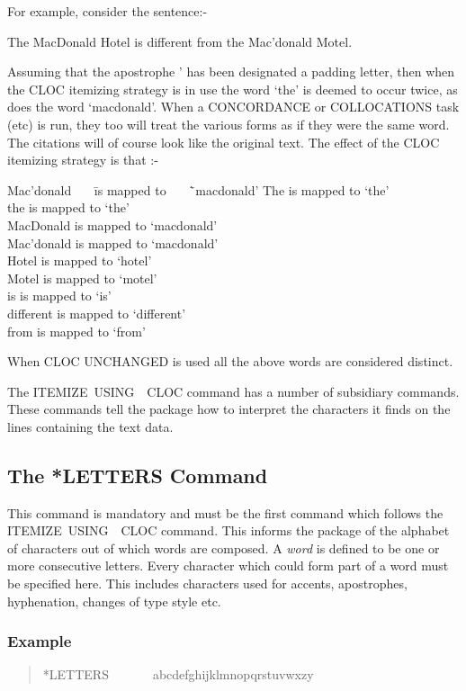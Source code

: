 For example, consider the sentence:-

The MacDonald Hotel is different from the Mac'donald Motel.

Assuming that the apostrophe ' has been designated a padding letter, then
when the CLOC itemizing strategy is in use the word `the' is deemed
to occur twice, as does the word `macdonald'. When a CONCORDANCE
or COLLOCATIONS task (etc) is run, they too will treat the various forms as
if they were the same word. The citations will of course look like the
original text. The effect of the CLOC itemizing strategy is that :-
\begin{tabbing}
Mac'donald~~~   \=is mapped to~~~     \=`macdonald'\kill
The             \>is mapped to        \>`the'\\
the             \>is mapped to        \>`the'\\
MacDonald       \>is mapped to        \>`macdonald'\\
Mac'donald      \>is mapped to        \>`macdonald'\\
Hotel           \>is mapped to        \>`hotel'\\
Motel           \>is mapped to        \>`motel'\\
is              \>is mapped to        \>`is'\\
different       \>is mapped to        \>`different'\\
from            \>is mapped to        \>`from'
\end{tabbing}
When CLOC UNCHANGED is used all the above words are considered distinct.

The ITEMIZE~USING~~CLOC command has a number of subsidiary commands.
These commands tell the package how to interpret the
characters it finds on the lines containing the text data.

\subsection{The *LETTERS Command}
This command is mandatory and must be the first command which follows the
ITEMIZE~USING~~CLOC command.  This informs the package of the
alphabet of characters out of which words are composed.
A {\em word} is defined to be one or more consecutive letters. Every character
which could form part of a word must be specified here.  This includes
characters used for accents, apostrophes, hyphenation, changes of type
style etc.

\subsubsection{Example}
\begin{quote}
*LETTERS~~~~~~~abcdefghijklmnopqrstuvwxzy
\end{quote}

